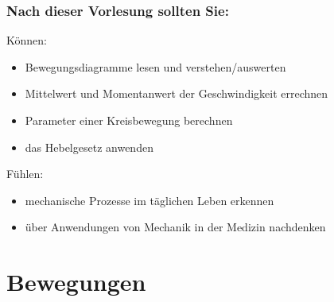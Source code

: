 \documentclass{beamer}
\begin{document}
\begin{frame}

\frametitle{Nach dieser Vorlesung sollten Sie:}
 



\begin{block}{Können:}
\begin{itemize}
\item
Bewegungsdiagramme lesen und verstehen/auswerten
\item
Mittelwert und Momentanwert der Geschwindigkeit errechnen
\item
Parameter einer Kreisbewegung berechnen
\item 
das Hebelgesetz anwenden
\end{itemize}
\end{block}


 
\begin{block}{Fühlen:}
\begin{itemize}
\item
mechanische Prozesse im täglichen Leben erkennen
\item
über Anwendungen von Mechanik in der Medizin nachdenken
\end{itemize}
\end{block}

 \end{frame}


\section{Bewegungen} 


\begin{frame}
\end{frame}
\end{document}
